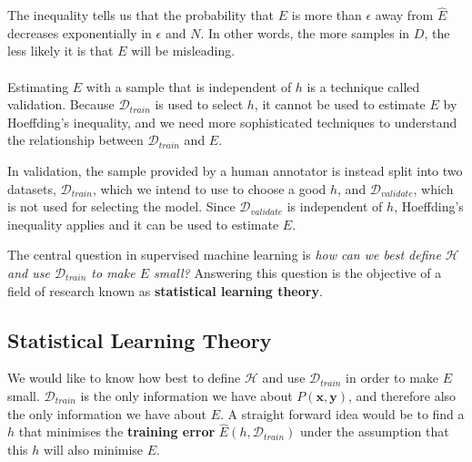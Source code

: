 The inequality tells us that the probability that $E$ is more than $\epsilon$ away from $\hat{E}$ decreases exponentially in $\epsilon$ and $N$. In other words, the more samples in $D$, the less likely it is that $E$ will be misleading.
\\\\
Estimating $E$ with a sample that is independent of $h$ is a technique called validation. Because $\mathcal{D}_{train}$ is used to select $h$, it cannot be used to estimate $E$ by Hoeffding's inequality, and we need more sophisticated techniques to understand the relationship between $\mathcal{D}_{train}$ and $E$.

In validation, the sample provided by a human annotator is instead split into two datasets, $\mathcal{D}_{train}$, which we intend to use to choose a good $h$, and $\mathcal{D}_{validate}$, which is not used for selecting the model. Since $\mathcal{D}_{validate}$ is independent of $h$, Hoeffding's inequality applies and it can be used to estimate $E$.

The central question in supervised machine learning is \textit{how can we best define $\mathcal{H}$ and use $\mathcal{D}_{train}$ to make $E$ small?} Answering this question is the objective of a field of research known as \textbf{statistical learning theory}.

\subsection{Statistical Learning Theory}
\label{statistical_learning_theory}
We would like to know how best to define $\mathcal{H}$ and use $\mathcal{D}_{train}$ in order to make $E$ small. $\mathcal{D}_{train}$ is the only information we have about $P(\mathbf{x}, \mathbf{y})$, and therefore also the only information we have about $E$. A straight forward idea would be to find a $h$ that minimises the \textbf{training error} $\hat{E}(h, \mathcal{D}_{train})$ under the assumption that this $h$ will also minimise $E$. 

